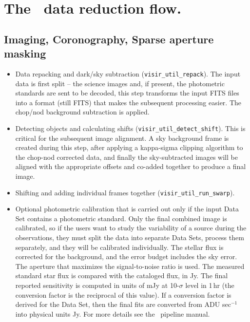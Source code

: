 \section{The \instname\ data reduction flow.}
\label{sec:reduction_flow}


\subsection{Imaging, Coronography, Sparse aperture masking}
\begin{itemize}
\item Data repacking and dark/sky subtraction 
({\tt visir\_util\_repack}). 
The input data is first split – the science images and, if present, 
the photometric standards are sent to be decoded, this step 
transforms the input FITS files into a format (still FITS) that 
makes the subsequent processing easier. The chop/nod background 
subtraction is applied.
\item Detecting objects and calculating shifts
({\tt visir\_util\_detect\_shift}). This is critical for the 
subsequent image alignment. A sky background 
frame is created during this step, after applying a kappa-sigma 
clipping algorithm to the chop-nod corrected data, and finally the 
sky-subtracted images will be aligned with the appropriate offsets 
and co-added together to produce a final image.
\item Shifting and adding individual frames together 
({\tt visir\_util\_run\_swarp}).
\item Optional photometric calibration that is carried out only 
if the input Data Set contains a photometric standard. Only the 
final combined image is calibrated, so if the users want to study 
the variability of a source during the observations, they must 
split the data into separate Data Sets, process them separately, 
and they will be calibrated individually.
The stellar flux is corrected for the background, and the error 
budget includes the sky error. The aperture that maximizes the 
signal-to-noise ratio is used. The measured standard star flux 
is compared with the cataloged flux, in Jy. The final 
reported sensitivity is computed in units of mJy at 10-$\sigma$ 
level in 1\,hr (the conversion factor is the reciprocal of this 
value). If a conversion factor is derived for the Data Set, then 
the final fits are converted from ADU sec$^{-1}$ into physical 
units Jy.
For more details see the \instname\ pipeline manual.
\end{itemize}

